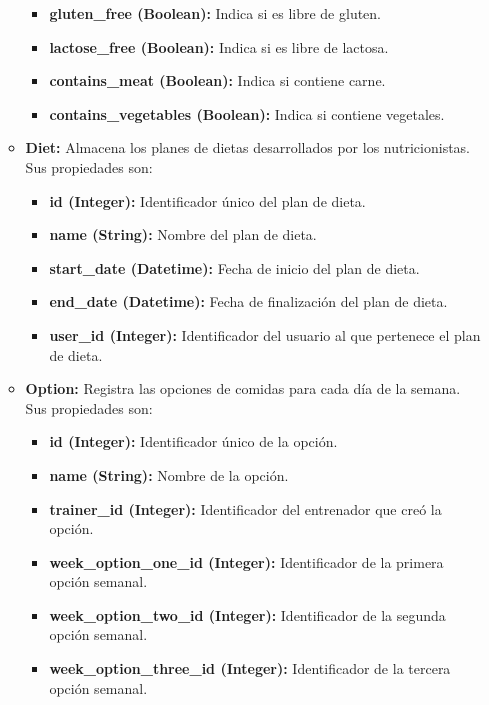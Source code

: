 \begin{itemize}
\begin{itemize}
\begin{itemize}
            \item \textbf{gluten\_free (Boolean):} Indica si es libre de gluten.
            \item \textbf{lactose\_free (Boolean):} Indica si es libre de lactosa.
            \item \textbf{contains\_meat (Boolean):} Indica si contiene carne.
            \item \textbf{contains\_vegetables (Boolean):} Indica si contiene vegetales.
        \end{itemize}
        \item \textbf{Diet:} Almacena los planes de dietas desarrollados por los nutricionistas. Sus propiedades son:
        \begin{itemize}
            \item \textbf{id (Integer):} Identificador único del plan de dieta.
            \item \textbf{name (String):} Nombre del plan de dieta.
            \item \textbf{start\_date (Datetime):} Fecha de inicio del plan de dieta.
            \item \textbf{end\_date (Datetime):} Fecha de finalización del plan de dieta.
            \item \textbf{user\_id (Integer):} Identificador del usuario al que pertenece el plan de dieta.
        \end{itemize}
        \item \textbf{Option:} Registra las opciones de comidas para cada día de la semana. Sus propiedades son:
        \begin{itemize}
            \item \textbf{id (Integer):} Identificador único de la opción.
            \item \textbf{name (String):} Nombre de la opción.
            \item \textbf{trainer\_id (Integer):} Identificador del entrenador que creó la opción.
            \item \textbf{week\_option\_one\_id (Integer):} Identificador de la primera opción semanal.
            \item \textbf{week\_option\_two\_id (Integer):} Identificador de la segunda opción semanal.
            \item \textbf{week\_option\_three\_id (Integer):} Identificador de la tercera opción semanal.
        \end{itemize}
    \end{itemize}


\end{itemize}
